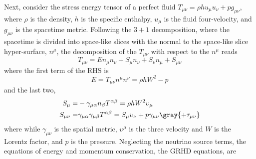 
Next, consider the stress energy tensor of a perfect fluid
%
$T_{\mu\nu} = \rho h u_{\mu} u_{\nu} + pg_{\mu\nu}$, 
%
where $\rho$ is the density, $h$ is the specific enthalpy, $u_{\mu}$ is the fluid four-velocity, 
and $g_{\mu\nu}$ is the spacetime metric.
%
Following the $3+1$ decomposition, 
where the spacetime is divided into space-like slices with the normal to the space-like slice 
hyper-surface, $n^{\mu}$, the decomposition of the $T_{\mu\nu}$ with respect to the $n^{\mu}$ reads
%
\begin{equation}
T_{\mu\nu} = En_{\mu}n_{\nu} + S_{\mu}n_{\nu} + S_{\nu}n_{\mu} + S_{\mu\nu}
\end{equation}
%
where the first term of the RHS is
%
\begin{equation}
E = T_{\mu\nu}n^{\mu}n^{\nu} = \rho h W^2 - p
\end{equation}
%
and the last two,
%
\begin{equation}
\begin{aligned}
S_{\mu} =& -\gamma_{\mu\alpha}n_{\beta}T^{\alpha\beta} = \rho h W^2 \upsilon_{\mu} \\
S_{\mu\nu} =& \gamma_{\mu\alpha}\gamma_{\mu\beta}T^{\alpha\beta} = S_{\mu}\upsilon_{\nu} + p \gamma_{\mu\nu} \gray{ + \tau_{\mu\nu}}
\end{aligned}
\end{equation}
%
where while $\gamma_{\mu\nu}$ is the spatial metric, $\upsilon^{\mu}$ is the three velocity and 
$W$ is the Lorentz factor, and $p$ is the pressure. 
%
Neglecting the neutrino source terms, the equations of energy and momentum conservation, 
the \ac{GRHD} equations, are 

